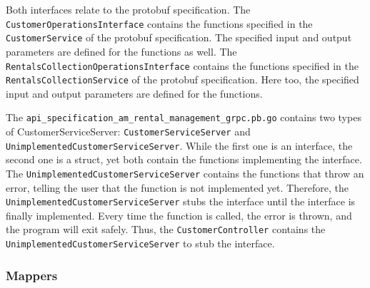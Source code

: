 Both interfaces relate to the protobuf specification.
The \texttt{CustomerOperationsInterface} contains the functions specified in the \texttt{CustomerService} of the protobuf specification.
The specified input and output parameters are defined for the functions as well.
The \texttt{RentalsCollectionOperationsInterface} contains the functions specified in the \texttt{RentalsCollectionService} of the protobuf specification.
Here too, the specified input and output parameters are defined for the functions.

The \texttt{api_specification_am_rental_management_grpc.pb.go} contains two types of CustomerServiceServer: \texttt{CustomerServiceServer} and \texttt{UnimplementedCustomerServiceServer}.
While the first one is an interface, the second one is a struct, yet both contain the functions implementing the interface.
The \texttt{UnimplementedCustomerServiceServer} contains the functions that throw an error, telling the user that the function is not implemented yet.
Therefore, the \texttt{UnimplementedCustomerServiceServer} stubs the interface until the interface is finally implemented.
Every time the function is called, the error is thrown, and the program will exit safely.
Thus, the \texttt{CustomerController} contains the \texttt{UnimplementedCustomerServiceServer} to stub the interface.

\subsubsection*{Mappers}

